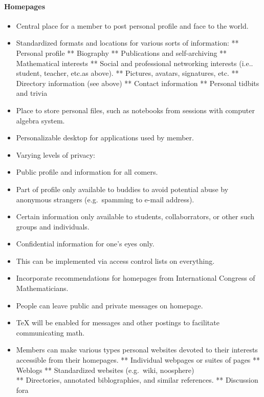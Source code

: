 \paragraph{Homepages}

\begin{itemize}
\item
  Central place for a member to post personal profile and face to the
  world.
\item
  Standardized formats and locations for various sorts of information:
  ** Personal profile ** Biography ** Publications and self-archiving **
  Mathematical interests ** Social and professional networking interests
  (i.e.. student, teacher, etc.as above). ** Pictures, avatars,
  signatures, etc. ** Directory information (see above) ** Contact
  information ** Personal tidbits and trivia
\item
  Place to store personal files, such as notebooks from sessions with
  computer algebra system.
\item
  Personalizable desktop for applications used by member.
\item
  Varying levels of privacy:
\item
  Public profile and information for all comers.
\item
  Part of profile only available to buddies to avoid potential abuse by
  anonymous strangers (e.g.~spamming to e-mail address).
\item
  Certain information only available to students, collaborrators, or
  other such groups and individuals.
\item
  Confidential information for one's eyes only.
\item
  This can be implemented via access control lists on everything.
\item
  Incorporate recommendations for homepages from International Congress
  of Mathematicians.
\item
  People can leave public and private messages on homepage.
\item
  TeX will be enabled for messages and other postings to facilitate
  communicating math.
\item
  Members can make various types personal websites devoted to their
  interests accessible from their homepages. ** Individual webpages or
  suites of pages ** Weblogs ** Standardized websites (e.g.~wiki,
  noosphere)\\ ** Directories, annotated biblographies, and similar
  references. ** Discussion fora
\end{itemize}

